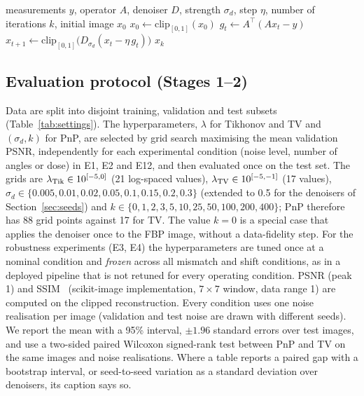 \begin{algorithm}[htbp]
\caption{PnP proximal gradient (PnP-PGD)}
\label{alg:pnp}
\begin{algorithmic}[1]
\Require measurements $y$, operator $A$, denoiser $D$, strength $\sigma_d$, step $\eta$, number of iterations $k$, initial image $x_0$
\State $x_0 \gets \mathrm{clip}_{[0,1]}(x_0)$
  \State $g_t \gets A^\top(Ax_t - y)$
  \State $x_{t+1} \gets \mathrm{clip}_{[0,1]}\bigl(D_{\sigma_d}(x_t - \eta \, g_t)\bigr)$
\EndFor
\State \Return $x_k$
\end{algorithmic}
\end{algorithm}

\subsection{Evaluation protocol (Stages 1--2)}\label{sec:protocol12}
Data are split into disjoint training, validation and test subsets (Table~\ref{tab:settings}). The hyperparameters, $\lambda$ for Tikhonov and TV and $(\sigma_d,k)$ for PnP, are selected by grid search maximising the mean validation PSNR, independently for each experimental condition (noise level, number of angles or dose) in E1, E2 and E12, and then evaluated once on the test set.
The grids are $\lambda_{\rm Tik}\in10^{[-5,0]}$ (21 log-spaced values), $\lambda_{\rm TV}\in10^{[-5,-1]}$ (17 values), $\sigma_d\in\{0.005,0.01,0.02,0.05,0.1,0.15,0.2,0.3\}$ (extended to 0.5 for the denoisers of Section~\ref{sec:seeds}) and $k\in\{0,1,2,3,5,10,25,50,100,200,400\}$; PnP therefore has 88 grid points against 17 for TV. The value $k=0$ is a special case that applies the denoiser once to the FBP image, without a data-fidelity step.
For the robustness experiments (E3, E4) the hyperparameters are tuned once at a nominal condition and \emph{frozen} across all mismatch and shift conditions, as in a deployed pipeline that is not retuned for every operating condition.
PSNR (peak 1) and SSIM~\citep{wang2004} (scikit-image implementation, $7\times7$ window, data range 1) are computed on the clipped reconstruction. Every condition uses one noise realisation per image (validation and test noise are drawn with different seeds).
We report the mean with a 95\% interval, $\pm1.96$ standard errors over test images, and use a two-sided paired Wilcoxon signed-rank test between PnP and TV on the same images and noise realisations. Where a table reports a paired gap with a bootstrap interval, or seed-to-seed variation as a standard deviation over denoisers, its caption says so.

